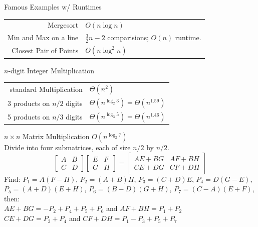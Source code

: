 \documentclass[10pt,a4paper]{article}
\begin{document}
\begin{multicols}{3}
\begin{textbox}{Famous Examples w/ Runtimes}
    \begin{tabular}{r|p{}}\scriptsize
        Mergesort  & $O(n\log n)$  \\
        Min and Max on a line & $\frac{3}{2}n - 2$ comparisions; $O(n)$ runtime.\\
        Closest Pair of Points &  $O(n \log^2 n)$ \\
    \end{tabular}
\end{textbox}

\begin{textbox}{$n$-digit Integer Multiplication}
    \begin{tabular}{r|p{}}\scriptsize
        standard Multiplication & $\Theta(n^2)$ \\
        3 products on $n/2$ digits & $\Theta(n^{\log_2 3}) = \Theta(n^{1.59})$ \\
        5 products on $n/3$ digits& $\Theta(n^{\log_3 5}) = \Theta(n^{1.46})$ \\
    \end{tabular}
\linebreak
\end{textbox}

\begin{textbox}{$n \times n$ Matrix Multiplication}
  $O(n^{\log_2 7})$ \\
Divide into four submatrices, each of size $n/2$ by $n/2$.
$$
\left[ \begin{array} {cc} A & B \\ C & D \end{array} \right ]
\left[ \begin{array} {cc} E & F \\ G & H \end{array} \right ]
=
\left[ \begin{array} {cc} AE+BG & AF+BH \\ CE+DG & CF+DH \end{array} \right ]
$$
Find: $P_1 = A(F-H)$, $P_2 = (A+B)H$, $P_3 = (C+D)E$, $P_4 = D(G-E)$, $P_5 = (A+D)(E+H)$, $P_6 = (B-D)(G+H)$, $P_7 = (C-A)(E+F)$, then: \\
\linebreak
$AE+BG = -P_2 + P_4 + P_5 + P_6$ and $AF +BH = P_1 + P_2$\\
$CE+DG = P_3 + P_4$ and $CF +DH = P_1 - P_3 + P_5 + P_7$\\
\end{textbox}


\end{multicols}
\end{document}
